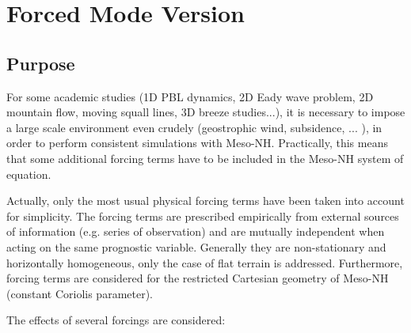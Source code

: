 %
%
\def\souligne#1{$\underline{\smash{\hbox{#1}}}$}
%
%

\chapter{Forced Mode Version}
\minitoc

\section{Purpose}
For some academic studies (1D PBL dynamics, 2D Eady wave problem, 2D mountain
flow, moving squall lines, 3D breeze studies...), it is necessary to impose a
large scale environment even crudely (geostrophic wind, subsidence, ... ), in
order to perform consistent simulations with Meso-NH. Practically, this means
that some additional forcing terms have to be included in the Meso-NH system of
equation.

Actually, only the most usual physical forcing terms have been taken into
account for simplicity. The forcing terms are prescribed empirically from
external sources of information (e.g. series of observation) and are
mutually independent when acting on the same prognostic variable. Generally
they are non-stationary and horizontally homogeneous, only the case of
flat terrain is addressed. Furthermore, forcing terms are considered for
the restricted Cartesian geometry of Meso-NH (constant Coriolis parameter).

The effects of several forcings are considered:

